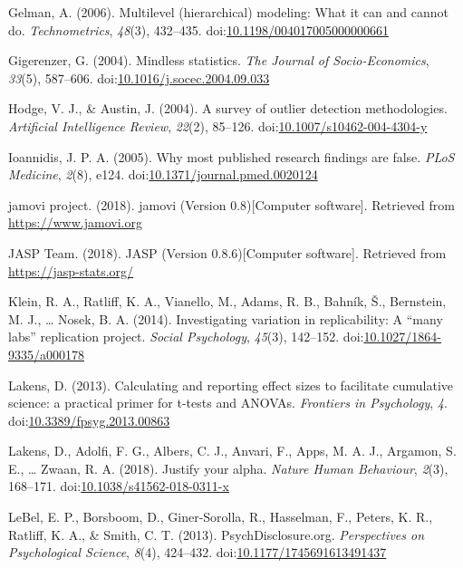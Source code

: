 \documentclass[english,man]{apa6}
\theoremstyle{definition}
\theoremstyle{definition}
\theoremstyle{definition}
\theoremstyle{remark}
\begin{document}
\hypertarget{ref-Gelman2006}{}
Gelman, A. (2006). Multilevel (hierarchical) modeling: What it can and
cannot do. \emph{Technometrics}, \emph{48}(3), 432--435.
doi:\href{https://doi.org/10.1198/004017005000000661}{10.1198/004017005000000661}

\hypertarget{ref-Gigerenzer2004}{}
Gigerenzer, G. (2004). Mindless statistics. \emph{The Journal of
Socio-Economics}, \emph{33}(5), 587--606.
doi:\href{https://doi.org/10.1016/j.socec.2004.09.033}{10.1016/j.socec.2004.09.033}

\hypertarget{ref-Hodge2004}{}
Hodge, V. J., \& Austin, J. (2004). A survey of outlier detection
methodologies. \emph{Artificial Intelligence Review}, \emph{22}(2),
85--126.
doi:\href{https://doi.org/10.1007/s10462-004-4304-y}{10.1007/s10462-004-4304-y}

\hypertarget{ref-Ioannidis2005}{}
Ioannidis, J. P. A. (2005). Why most published research findings are
false. \emph{PLoS Medicine}, \emph{2}(8), e124.
doi:\href{https://doi.org/10.1371/journal.pmed.0020124}{10.1371/journal.pmed.0020124}

\hypertarget{ref-jamovi2018}{}
jamovi project. (2018). jamovi (Version 0.8){[}Computer software{]}.
Retrieved from \url{https://www.jamovi.org}

\hypertarget{ref-JASP2018}{}
JASP Team. (2018). JASP (Version 0.8.6){[}Computer software{]}.
Retrieved from \url{https://jasp-stats.org/}

\hypertarget{ref-Klein2014c}{}
Klein, R. A., Ratliff, K. A., Vianello, M., Adams, R. B., Bahník, Š.,
Bernstein, M. J., \ldots{} Nosek, B. A. (2014). Investigating variation
in replicability: A ``many labs'' replication project. \emph{Social
Psychology}, \emph{45}(3), 142--152.
doi:\href{https://doi.org/10.1027/1864-9335/a000178}{10.1027/1864-9335/a000178}

\hypertarget{ref-Lakens2013}{}
Lakens, D. (2013). Calculating and reporting effect sizes to facilitate
cumulative science: a practical primer for t-tests and ANOVAs.
\emph{Frontiers in Psychology}, \emph{4}.
doi:\href{https://doi.org/10.3389/fpsyg.2013.00863}{10.3389/fpsyg.2013.00863}

\hypertarget{ref-Lakens2018}{}
Lakens, D., Adolfi, F. G., Albers, C. J., Anvari, F., Apps, M. A. J.,
Argamon, S. E., \ldots{} Zwaan, R. A. (2018). Justify your alpha.
\emph{Nature Human Behaviour}, \emph{2}(3), 168--171.
doi:\href{https://doi.org/10.1038/s41562-018-0311-x}{10.1038/s41562-018-0311-x}

\hypertarget{ref-LeBel2013}{}
LeBel, E. P., Borsboom, D., Giner-Sorolla, R., Hasselman, F., Peters, K.
R., Ratliff, K. A., \& Smith, C. T. (2013). PsychDisclosure.org.
\emph{Perspectives on Psychological Science}, \emph{8}(4), 424--432.
doi:\href{https://doi.org/10.1177/1745691613491437}{10.1177/1745691613491437}
\end{document}
